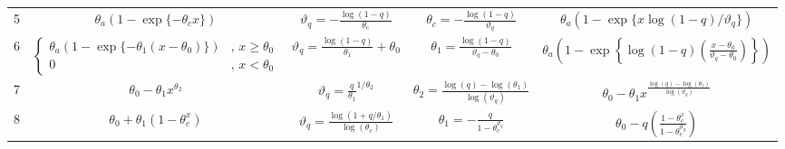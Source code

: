 \begin{tabular*}{\textwidth}{@{\extracolsep{\fill}}ccccc}
5 &
$\theta_a(1-\exp\{-\theta_c x\})$ &
$\vartheta_q = \displaystyle-\frac{\log(1-q)}{\theta_c}$ &
$\theta_c = \displaystyle-\frac{\log(1-q)}{\vartheta_q}$ &
$\theta_a(1-\exp\{x \log(1-q)/\vartheta_q\})$\tabularnewline
6 &
$\begin{cases} \theta_a(1-\exp\{-\theta_1(x-\theta_0)\}) &,\, x\geq \theta_0 \\  0 &,\, x<\theta_0  \end{cases}$ &
$\displaystyle\vartheta_q = \frac{\log(1-q)}{\theta_1}+\theta_0$ &
$\displaystyle\theta_1 = \frac{\log(1-q)}{\vartheta_q-\theta_0}$ &
$\displaystyle \theta_a\left(1-\exp\left\{\log(1-q)\left(\frac{x-\theta_0}{\vartheta_q-\theta_0}\right)\right\}\right)$\tabularnewline
7 &
$\theta_0-\theta_1 x^{\theta_2}$ &
$\vartheta_q = \displaystyle\frac{q}{\theta_1}^{1/\theta_2}$ &
$\displaystyle\theta_2 = \frac{\log(q)-\log(\theta_1)}{\log(\vartheta_q)} $ &
$\displaystyle\theta_0-\theta_1 x^{\frac{\log(q)-\log(\theta_1)}{\log(\vartheta_q)}}$\tabularnewline
8 &
$\theta_0+\theta_1(1-\theta_c^x)$ &
$\displaystyle\vartheta_q = \frac{\log(1+q/\theta_1)}{\log(\theta_c)}$ &
$\displaystyle\theta_1 = -\frac{q}{1-\theta_c^{\vartheta_q}}$ &
$\displaystyle\theta_0-q \left(\frac{1-\theta_c^x}{1-\theta_c^{\vartheta_q}}\right)$\tabularnewline
\hline 
\end{tabular*}

